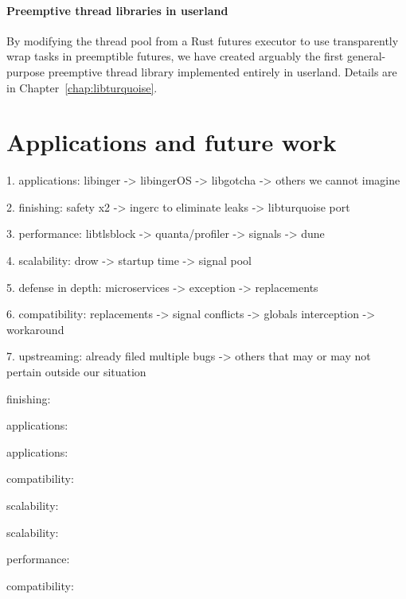 \paragraph{Preemptive thread libraries in userland}
By modifying the thread pool from a Rust futures executor to use transparently wrap
tasks in preemptible futures, we have created arguably the first general-purpose
preemptive thread library implemented entirely in userland.  Details are in
Chapter~\ref{chap:libturquoise}.


\section{Applications and future work}
\label{sec:thatsawrap:applications}

1. applications: libinger -> libingerOS -> libgotcha -> others we cannot imagine

2. finishing: safety x2 -> ingerc to eliminate leaks -> libturquoise port

3. performance: libtlsblock -> quanta/profiler -> signals -> dune

4. scalability: drow -> startup time -> signal pool

5. defense in depth: microservices -> exception -> replacements

6. compatibility: replacements -> signal conflicts -> globals interception -> workaround

7. upstreaming: already filed multiple bugs -> others that may or may not pertain outside our situation

finishing: 

applications: 

applications: 

compatibility: 

scalability: 

scalability: 

performance: 

compatibility: 

